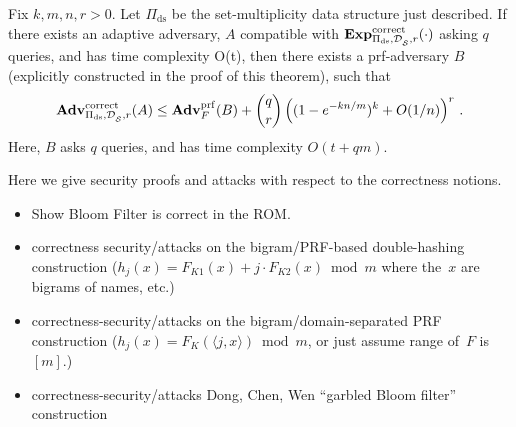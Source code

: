 \begin{theorem}\label{thm2}
Fix $k,m,n,r >0$. Let $\Pi_{\mathrm{ds}}$ be the set-multiplicity data structure just described. If there exists an adaptive adversary, $A$ compatible with $\mathrm{\mathbf{Exp}}^{\mathrm{correct}}_{\Pi_{\mathrm{ds}},\mathcal{D}_{{\cal S}}^{},r}(\cdot)$ asking $q$ queries, and has time complexity O(t), then there exists a prf-adversary $B$ (explicitly constructed in the proof of this theorem), such that
\[
\mathrm{\mathbf{Adv}}^{\mathrm{correct}}_{\Pi_{\mathrm{ds}},\mathcal{D}_{{\cal S}}^{},r}(A) \leq  \mathbf{Adv}^{\mathrm{prf}}_{F}(B)  + {\dbinom{q}{r}} \left( (1-e^{-kn/m})^k + O(1/n) \right)^r\,.
\]
Here, $B$ asks $q$ queries, and has time complexity $O(t+qm)$.
\end{theorem}


  Here we give security proofs and attacks with respect to the correctness notions.
\begin{itemize}
\item Show Bloom Filter is correct in the ROM. 
\item correctness security/attacks on the bigram/PRF-based double-hashing construction ($h_j(x) = F_{K1}(x) + j\cdot F_{K2}(x) \bmod m$ where the~$x$ are bigrams of names, etc.)
\item correctness-security/attacks on the bigram/domain-separated PRF construction ($h_j(x)=F_K(\langle j,x \rangle) \bmod m$, or just assume range of~$F$ is $[m]$.) 
\item correctness-security/attacks Dong, Chen, Wen ``garbled Bloom filter'' construction

\end{itemize}

